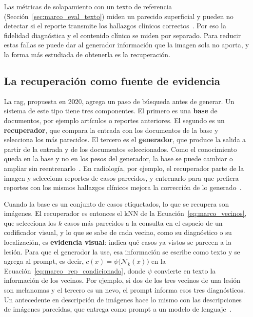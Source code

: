 Las métricas de solapamiento con un texto de referencia (Sección~\ref{sec:marco_eval_texto}) miden un parecido
superficial y pueden no detectar si el reporte transmite los hallazgos clínicos
correctos~\cite{hartsock2024vision}. Por eso la fidelidad diagnóstica y el contenido clínico se miden por
separado. Para reducir estas fallas se puede dar al generador información que la imagen sola no aporta, y la
forma más estudiada de obtenerla es la recuperación.

\subsection{La recuperación como fuente de evidencia}
\label{sec:marco_rep_recuperacion}

\label{sec:marco_rag}%
La \gls{rag}, propuesta en 2020, agrega un paso de búsqueda antes de generar. Un sistema de este tipo tiene
tres componentes. El primero es una \textbf{base} de documentos, por ejemplo artículos o reportes anteriores. El
segundo es un \textbf{recuperador}, que compara la entrada con los documentos de la base y selecciona los más
parecidos. El tercero es el \textbf{generador}, que produce la salida a partir de la entrada y de los documentos
seleccionados. Como el conocimiento queda en la base y no en los pesos del generador, la base se puede cambiar o
ampliar sin reentrenarlo~\cite{lewis2020retrievalaugmented}. En radiología, por ejemplo, el recuperador parte
de la imagen y selecciona reportes de casos parecidos, y entrenarlo para que prefiera reportes con los mismos
hallazgos clínicos mejora la corrección de lo generado~\cite{sun2025factaware}.

\label{sec:marco_recuperacion_imagenes}%
Cuando la base es un conjunto de casos etiquetados, lo que se recupera son imágenes. El recuperador es entonces
el kNN de la Ecuación~\ref{eq:marco_vecinos}, que selecciona los $k$ casos más parecidos a la consulta en el
espacio de un codificador visual, y lo que se sabe de cada vecino, como su diagnóstico o su localización, es
\textbf{evidencia visual}: indica qué casos ya vistos se parecen a la lesión. Para que el generador la use, esa
información se escribe como texto y se agrega al prompt, es decir, $c(x) = \psi\bigl(\mathcal{N}_k(x)\bigr)$ en
la Ecuación~\ref{eq:marco_rep_condicionada}, donde $\psi$ convierte en texto la información de los vecinos. Por
ejemplo, si dos de los tres vecinos de una lesión son melanomas y el tercero es un nevo, el prompt informa esos
tres diagnósticos. Un antecedente en descripción de imágenes hace lo mismo con las descripciones de imágenes
parecidas, que entrega como prompt a un modelo de lenguaje~\cite{ramos2023smallcap}.

